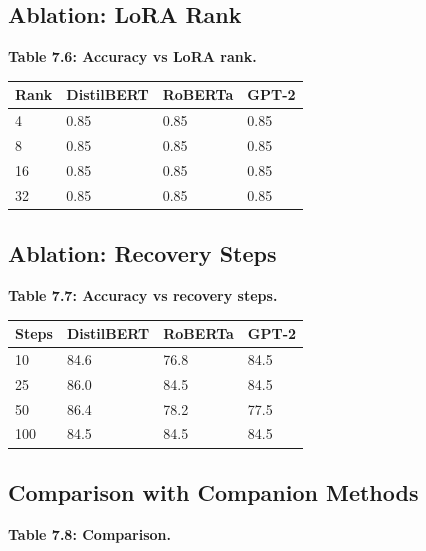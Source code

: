 \subsection{Ablation: LoRA Rank}

\textbf{Table 7.6: Accuracy vs LoRA rank.}

\begin{table}[H]
\centering
\small
\begin{tabular}{llll}
\toprule
\textbf{Rank} & \textbf{DistilBERT} & \textbf{RoBERTa} & \textbf{GPT-2} \\
\midrule
4 & 0.85 & 0.85 & 0.85 \\
8 & 0.85 & 0.85 & 0.85 \\
16 & 0.85 & 0.85 & 0.85 \\
32 & 0.85 & 0.85 & 0.85 \\
\bottomrule
\end{tabular}
\end{table}

\subsection{Ablation: Recovery Steps}

\textbf{Table 7.7: Accuracy vs recovery steps.}

\begin{table}[H]
\centering
\small
\begin{tabular}{llll}
\toprule
\textbf{Steps} & \textbf{DistilBERT} & \textbf{RoBERTa} & \textbf{GPT-2} \\
\midrule
10 & 84.6 & 76.8 & 84.5 \\
25 & 86.0 & 84.5 & 84.5 \\
50 & 86.4 & 78.2 & 77.5 \\
100 & 84.5 & 84.5 & 84.5 \\
\bottomrule
\end{tabular}
\end{table}

\subsection{Comparison with Companion Methods}

\textbf{Table 7.8: Comparison.}

